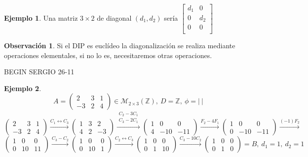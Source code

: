 \documentclass{article}
\theoremstyle{theorem-style}  %
\theoremstyle{definition}
\newtheorem*{observation}{Observación} %
\theoremstyle{example-style}
\newtheorem{example}{Ejemplo}[section]
\begin{document}
	\begin{example}
		Una matriz $3\times 2$ de diagonal $(d_1,d_2)$ sería $\begin{bmatrix}
		d_1 & 0  \\
		0   & d_2\\
		0   & 0  \\
		\end{bmatrix}$
	\end{example}
	\begin{observation}
		Si el DIP es euclídeo la diagonalización se realiza mediante operaciones elementales, si no lo es, necesitaremos otras operaciones.
	\end{observation}

	BEGIN SERGIO 26-11

	\begin{example}
		\[ A = \begin{pmatrix}
				2 & 3 & 1 \\
				-3 & 2 & 4
		\end{pmatrix} \in \mathcal{M}_{2\times 3}(\mathbb{Z}), \ D=\mathbb{Z}, \ \phi=|\ |\]
		\[ \begin{pmatrix}
			2 & 3 & 1 \\
			-3 & 2 & 4
		\end{pmatrix} \xrightarrow{C_1\leftrightarrow C_3} \begin{pmatrix}
			1 & 3 & 2 \\
			4 & 2 & -3
			\end{pmatrix}\xrightarrow{\substack{C_2-3C_1\\C_3-2C_1}} \begin{pmatrix}
			1 & 0 & 0 \\
			4 & -10 & -11
			\end{pmatrix}\xrightarrow{F_2-4F_1}\begin{pmatrix}
			1 & 0 & 0 \\
			0 & -10 & -11
		\end{pmatrix}
	\xrightarrow{(-1)F_2}\]
		\[\begin{pmatrix}
			1 & 0 & 0 \\
			0 & 10 & 11
		\end{pmatrix}
		\xrightarrow{C_3-C_2} \begin{pmatrix}
			1 & 0 & 0 \\
			0 & 10 & 1
		\end{pmatrix}
		\xrightarrow{C_2\leftrightarrow C_3} \begin{pmatrix}
			1 & 0 & 0 \\
			0 & 1 & 10
		\end{pmatrix}
		\xrightarrow{C_3-10C_2}\begin{pmatrix}
			1 & 0 & 0 \\
			0 & 1 & 0
	\end{pmatrix}=B, \ d_1=1, \ d_2=1 \]


\end{example}
\end{document}
